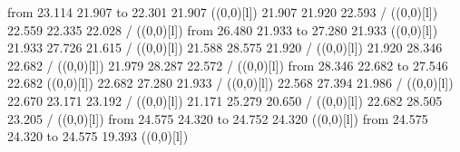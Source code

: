 {{\color[rgb]{0,0,0}\putrule from 23.114 21.907 to 22.301 21.907
}%
%
%
\linethickness=1pt
\setplotsymbol ({\makebox(0,0)[l]{\tencirc{}}})
{\color[rgb]{0,0,0} 21.907 21.920 22.593 /
}%
%
%
\linethickness=1pt
\setplotsymbol ({\makebox(0,0)[l]{\tencirc{}}})
{\color[rgb]{0,0,0} 22.559 22.335 22.028 /
}%
%
%
\linethickness=1pt
\setplotsymbol ({\makebox(0,0)[l]{\tencirc{}}})
{\color[rgb]{0,0,0}\putrule from 26.480 21.933 to 27.280 21.933
}%
%
%
\linethickness=1pt
\setplotsymbol ({\makebox(0,0)[l]{\tencirc{}}})
{\color[rgb]{0,0,0} 21.933 27.726 21.615 /
}%
%
%
\linethickness=1pt
\setplotsymbol ({\makebox(0,0)[l]{\tencirc{}}})
{\color[rgb]{0,0,0} 21.588 28.575 21.920 /
}%
%
%
\linethickness=1pt
\setplotsymbol ({\makebox(0,0)[l]{\tencirc{}}})
{\color[rgb]{0,0,0} 21.920 28.346 22.682 /
}%
%
%
\linethickness=1pt
\setplotsymbol ({\makebox(0,0)[l]{\tencirc{}}})
{\color[rgb]{0,0,0} 21.979 28.287 22.572 /
}%
%
%
\linethickness=1pt
\setplotsymbol ({\makebox(0,0)[l]{\tencirc{}}})
{\color[rgb]{0,0,0}\putrule from 28.346 22.682 to 27.546 22.682
}%
%
%
\linethickness=1pt
\setplotsymbol ({\makebox(0,0)[l]{\tencirc{}}})
{\color[rgb]{0,0,0} 22.682 27.280 21.933 /
}%
%
%
\linethickness=1pt
\setplotsymbol ({\makebox(0,0)[l]{\tencirc{}}})
{\color[rgb]{0,0,0} 22.568 27.394 21.986 /
}%
%
%
\linethickness=1pt
\setplotsymbol ({\makebox(0,0)[l]{\tencirc{}}})
{\color[rgb]{0,0,0} 22.670 23.171 23.192 /
}%
%
%
\linethickness=1pt
\setplotsymbol ({\makebox(0,0)[l]{\tencirc{}}})
{\color[rgb]{0,0,0} 21.171 25.279 20.650 /
}%
%
%
\linethickness=1pt
\setplotsymbol ({\makebox(0,0)[l]{\tencirc{}}})
{\color[rgb]{0,0,0} 22.682 28.505 23.205 /
}%
%
%
\linethickness=1pt
\setplotsymbol ({\makebox(0,0)[l]{\tencirc{}}})
{\color[rgb]{0,0,0}\putrule from 24.575 24.320 to 24.752 24.320
}%
%
%
\linethickness=1pt
\setplotsymbol ({\makebox(0,0)[l]{\tencirc{}}})
{\color[rgb]{0,0,0}\putrule from 24.575 24.320 to 24.575 19.393
}%
%
%
\linethickness=1pt
\setplotsymbol ({\makebox(0,0)[l]{\tencirc{}}})
}
